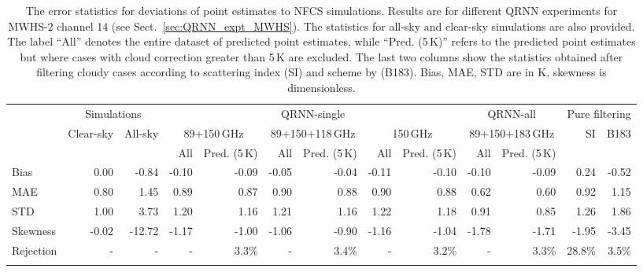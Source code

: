 \documentclass[amt, manuscript]{copernicus}
\begin{document}
\begin{table}[t]
	\caption{The error statistics for deviations of point estimates to NFCS simulations. Results are for different QRNN experiments for MWHS-2 channel 14 (see Sect.~\ref{sec:QRNN_expt_MWHS}). The statistics for all-sky and clear-sky simulations are also provided. The label ``All'' denotes the entire dataset of predicted point estimates, while ``Pred. (5\,K)'' refers to the predicted point estimates but where cases with cloud correction greater than 5\,K are excluded. The last two columns show the statistics obtained after filtering cloudy cases according to scattering index (SI) and scheme by \citet{buehler:aclou:07} (B183). Bias, MAE, STD are in K, skewness is dimensionless.}
	\label{tab:error_statistics_mwhs_14}
	\setlength{\tabcolsep}{4pt}
	\begin{tabular}{lrr|rr|rr|rr|rr|rr}
		\tophline
		&\multicolumn{2}{c|}{Simulations}& \multicolumn{6}{c|}{QRNN-single} & \multicolumn{2}{c|}{QRNN-all} & \multicolumn{2}{c}{Pure filtering}\\
		\cline{2-13}
		&   Clear-sky &   All-sky &  \multicolumn{2}{c|}{89+150\,GHz} & \multicolumn{2}{c|}{89+150+118\,GHz} & \multicolumn{2}{c|}{150\,GHz} & \multicolumn{2}{c|}{89+150+183\,GHz}& SI & B183\\		
		&			   &			& All & Pred. (5\,K) & All & Pred. (5\,K) & All & Pred. (5\,K)  & All & Pred. (5\,K)&&\\
		\middlehline
Bias     &  0.00 &  -0.84 & -0.10 & -0.09 & -0.05 & -0.04 & -0.11 & -0.10 & -0.10 & -0.09 & 0.24  & -0.52\\
MAE      &  0.80 &   1.45 &  0.89 &  0.87 &  0.90 &  0.88 &  0.90 &  0.88 &  0.62 &  0.60 & 0.92  & 1.15\\
STD      &  1.00 &   3.73 &  1.20 &  1.16 &  1.21 &  1.16 &  1.22 &  1.18 &  0.91 &  0.85 & 1.26  & 1.86\\
Skewness & -0.02 & -12.72 & -1.17 & -1.00 & -1.06 & -0.90 & -1.16 & -1.04 & -1.78 & -1.71 &-1.95  & -3.45\\
Rejection&  -	 & - 	  & - 	  & 3.3\% & - 	  & 3.4\% & -     & 3.2\% & -     & 3.3\% & 28.8\%& 3.5\%\\
\bottomhline
	\end{tabular}
\end{table}
\end{document}
